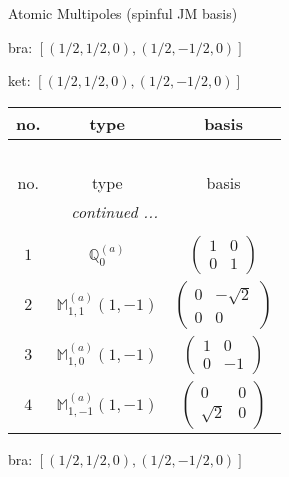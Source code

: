 \documentclass[fleqn,8pt,landscape]{jsarticle}
\begin{document}
\setcounter{MaxMatrixCols}{16}

\begin{center}
\LARGE
Atomic Multipoles (spinful JM basis)
\end{center}
bra: $[(1/2,1/2,0),(1/2,-1/2,0)]$

\noindent
ket: $[(1/2,1/2,0),(1/2,-1/2,0)]$
\begin{center}
\renewcommand{\arraystretch}{1.6}
\begin{longtable}{ccc}
 \hline \hline
no. & type & basis \\ \hline \endfirsthead

\multicolumn{2}{l}{\tablename\ \thetable{}} \\
 \hline \hline
no. & type & basis \\ \hline \endhead

 \hline \hline
\multicolumn{2}{r}{\footnotesize\it continued ...} \\ \endfoot

 \hline \hline
\multicolumn{2}{r}{} \\ \endlastfoot

$ 1 $ & $ \mathbb{Q}_{0}^{(a)} $ & $ \begin{pmatrix} 1 & 0 \\ 0 & 1 \end{pmatrix} $ \\ \hline
$ 2 $ & $ \mathbb{M}_{1,1}^{(a)}(1,-1) $ & $ \begin{pmatrix} 0 & - \sqrt{2} \\ 0 & 0 \end{pmatrix} $ \\ \hline
$ 3 $ & $ \mathbb{M}_{1,0}^{(a)}(1,-1) $ & $ \begin{pmatrix} 1 & 0 \\ 0 & -1 \end{pmatrix} $ \\ \hline
$ 4 $ & $ \mathbb{M}_{1,-1}^{(a)}(1,-1) $ & $ \begin{pmatrix} 0 & 0 \\ \sqrt{2} & 0 \end{pmatrix} $ \\
\end{longtable}
\end{center}
bra: $[(1/2,1/2,0),(1/2,-1/2,0)]$
\end{document}
